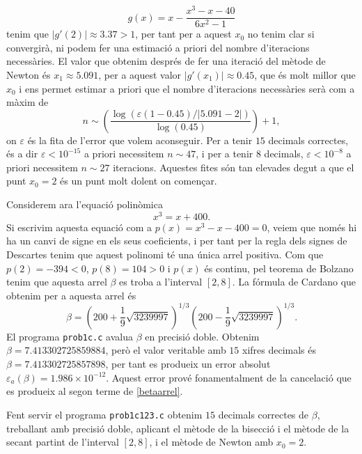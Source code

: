 \documentclass[12pt]{article}
\begin{document}
\begin{equation}\label{pfix}
	g(x)=x-\dfrac{x^3-x-40}{6x^2-1}
\end{equation}
tenim que $|g'(2)|\approx3.37>1$, per tant per a aquest $x_0$ no tenim clar si convergirà, ni podem fer una estimació a priori del nombre d'iteracions necessàries. El valor que obtenim després de fer una iteració del mètode de Newton és $x_1\approx5.091$, per a aquest valor $|g'(x_1)|\approx0.45$, que és molt millor que $x_0$ i ens permet estimar a priori que el nombre d'iteracions necessàries serà com a màxim de
\begin{equation}\label{iteracions}
	n\sim\left( \dfrac{\log(\varepsilon(1-0.45)/|5.091-2|)}{\log(0.45)}\right)+1,
\end{equation}
on $\varepsilon$ és la fita de l'error que volem aconseguir. Per a tenir $15$ decimals correctes, és a dir $\varepsilon<10^{-15}$ a priori necessitem $n\sim47$, i per a tenir $8$ decimals, $\varepsilon<10^{-8}$ a priori necessitem $n\sim27$ iteracions. Aquestes fites són tan elevades degut a que el punt $x_0=2$ és un punt molt dolent on començar.


Considerem ara l'equació polinòmica
\begin{equation}\label{pol:2}
	x^3=x+400.
\end{equation}
Si escrivim aquesta equació com a $p(x)=x^3-x-400=0$, veiem que només hi ha un canvi de signe en els seus coeficients, i per tant per la regla dels signes de Descartes tenim que aquest polinomi té una única arrel positiva. Com que $p(2)=-394<0$, $p(8)=104>0$ i $p(x)$ és continu, pel teorema de Bolzano tenim que aquesta arrel $\beta$ es troba a l'interval $[2,8]$. La fórmula de Cardano que obtenim per a aquesta arrel és
\begin{equation}\label{betaarrel}
	\beta=\left( 200+\frac{1}{9}\sqrt{3239997}\right)^{1/3}\left( 200-\frac{1}{9}\sqrt{3239997}\right)^{1/3}.
\end{equation}
El programa \texttt{prob1c.c} avalua $\beta$ en precisió doble. Obtenim $\beta=\num{7.413302725859884}$, però el valor veritable amb $15$ xifres decimals és $\beta=\num{7.413302725857898}$, per tant es produeix un error absolut $\varepsilon_a(\beta)=1.986\times10^{-12}$. Aquest error prové fonamentalment de la cancelació que es produeix al segon terme de \eqref{betaarrel}.

Fent servir el programa \texttt{prob1c123.c} obtenim $15$ decimals correctes de $\beta$, treballant amb precisió doble, aplicant el mètode de la bisecció i el mètode de la secant partint de l'interval $[2,8]$, i el mètode de Newton amb $x_0=2$.
\end{document}
